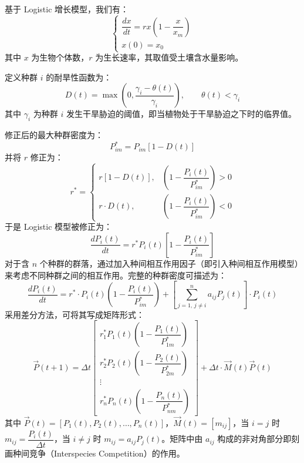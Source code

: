 \documentclass[11pt,a4paper]{ctexart}
\begin{document}
基于 Logistic 增长模型，我们有：
\begin{equation}
\begin{cases}
\dfrac{dx}{dt}=rx\left(1-\dfrac{x}{x_m}\right)\\[0.6em]
x(0)=x_0
\end{cases}
\end{equation}
其中 $x$ 为生物个体数，$r$ 为生长速率，其取值受土壤含水量影响。

定义种群 $i$ 的耐旱性函数为：
\begin{equation}
D(t)=\max\left(0,\frac{\gamma_i-\theta(t)}{\gamma_i}\right),\qquad \theta(t)<\gamma_i
\end{equation}
其中 $\gamma_i$ 为种群 $i$ 发生干旱胁迫的阈值，即当植物处于干旱胁迫之下时的临界值。

修正后的最大种群密度为：
\begin{equation}
P_{im}^{*}=P_{im}\left[1-D(t)\right]
\end{equation}
并将 $r$ 修正为：
\begin{equation}
r^{*}=
\begin{cases}
r\left[1-D(t)\right], & \left(1-\dfrac{P_i(t)}{P_{im}^{*}}\right)>0\\[0.9em]
r\cdot D(t), & \left(1-\dfrac{P_i(t)}{P_{im}^{*}}\right)<0
\end{cases}
\end{equation}
于是 Logistic 模型被修正为：
\begin{equation}
\frac{dP_i(t)}{dt}=r^{*}P_i(t)\left[1-\frac{P_i(t)}{P_{im}^{*}}\right]
\end{equation}
对于含 $n$ 个种群的群落，通过加入种间相互作用因子（即引入种间相互作用模型）来考虑不同种群之间的相互作用。完整的种群密度可描述为：
\begin{equation}
\frac{dP_i(t)}{dt}=r^{*}\cdot P_i(t)\left(1-\frac{P_i(t)}{P_{im}^{*}}\right)+\left[\sum_{j=1,\,j\neq i}^{n}a_{ij}P_j(t)\right]\cdot P_i(t)
\end{equation}
采用差分方法，可将其写成矩阵形式：
\begin{equation}
\vec{P}(t+1)=\Delta t
\begin{bmatrix}
r_1^{*}P_1(t)\left(1-\dfrac{P_1(t)}{P_{1m}^{*}}\right)\\[0.5em]
r_2^{*}P_2(t)\left(1-\dfrac{P_2(t)}{P_{2m}^{*}}\right)\\[0.5em]
\vdots\\[0.5em]
r_n^{*}P_n(t)\left(1-\dfrac{P_n(t)}{P_{nm}^{*}}\right)
\end{bmatrix}
+\Delta t\cdot\vec{M}(t)\vec{P}(t)
\end{equation}
其中 $\vec{P}(t)=[P_1(t),P_2(t),\dots,P_n(t)]$，$\vec{M}(t)=[m_{ij}]$，当 $i=j$ 时 $m_{ij}=\dfrac{P_i(t)}{\Delta t}$，当 $i\neq j$ 时 $m_{ij}=a_{ij}P_j(t)$。矩阵中由 $a_{ij}$ 构成的非对角部分即刻画种间竞争（Interspecies Competition）的作用。
\end{document}
